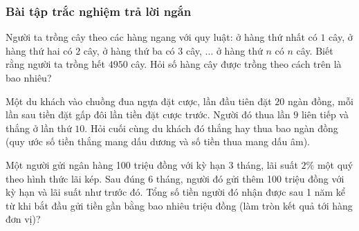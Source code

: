 \subsubsection{Bài tập trắc nghiệm trả lời ngắn}
\begin{ex}%
	Người ta trồng cây theo các hàng ngang với quy luật: ở hàng thứ nhất có $1$ cây, ở hàng thứ hai có $2$ cây, ở hàng thứ ba có $3$ cây, $\ldots$ ở hàng thứ $n$ có $n$ cây. Biết rằng người ta trồng hết $4950$ cây. Hỏi số hàng cây được trồng theo cách trên là bao nhiêu?
\end{ex}
\begin{ex}%
	Một du khách vào chuồng đua ngựa đặt cược, lần đầu tiên đặt $20$ ngàn đồng, mỗi lần sau tiền đặt gấp đôi lần tiền đặt cược trước. Người đó thua lần $9$ liên tiếp và thắng ở lần thứ $10$. Hỏi cuối cùng du khách đó thắng hay thua bao ngàn đồng (quy ước số tiền thắng mang dấu dương và số tiền thua mang dấu âm).
\end{ex}
\begin{ex}%
	Một người gửi ngân hàng 100 triệu đồng với kỳ hạn 3 tháng, lãi suất $2\%$ một quý theo hình thức lãi kép. Sau đúng 6 tháng, người đó gửi thêm 100 triệu đồng với kỳ hạn và lãi suất như trước đó. Tổng số tiền người đó nhận được sau 1 năm kể từ khi bắt đầu gửi tiền gần bằng bao nhiêu triệu đồng (làm tròn kết quả tới hàng đơn vị)?
\end{ex}
